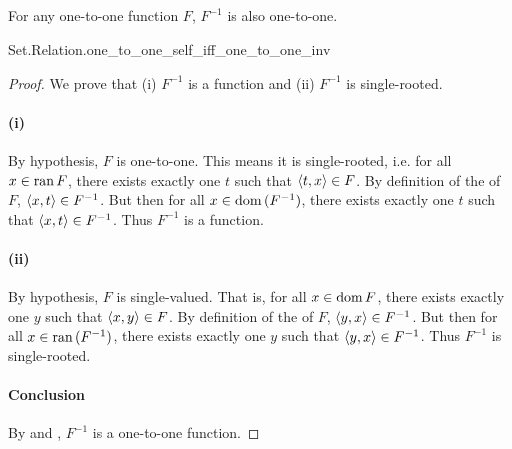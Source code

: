\documentclass{report}
\begin{document}
\subsection{}%

  \begin{lemma}[1]
    For any one-to-one function $F$, $F^{-1}$ is also one-to-one.
  \end{lemma}

    {Set.Relation.one\_to\_one\_self\_iff\_one\_to\_one\_inv}

  \begin{proof}
    We prove that (i) $F^{-1}$ is a function and (ii) $F^{-1}$ is single-rooted.

    \paragraph{(i)}%

      By hypothesis, $F$ is one-to-one.
      This means it is single-rooted, i.e. for all $x \in \mathop{\text{ran}}{F}$, there exists
        exactly one $t$ such that $\left< t, x \right> \in F$.
      By definition of the  of $F$,
        $\left< x, t \right> \in F^{-1}$.
      But then for all $x \in \mathop{\text{dom}}{(F^{-1})}$, there exists exactly one $t$ such
        that $\left< x, t \right> \in F^{-1}$.
      Thus $F^{-1}$ is a function.

    \paragraph{(ii)}%

      By hypothesis, $F$ is single-valued.
      That is, for all $x \in \mathop{\text{dom}}{F}$, there exists exactly one $y$ such that
        $\left< x, y \right> \in F$.
      By definition of the  of $F$,
        $\left< y, x \right> \in F^{-1}$.
      But then for all $x \in \mathop{\text{ran}}{(F^{-1})}$, there exists exactly one $y$ such
        that $\left< y, x \right> \in F^{-1}$.
      Thus $F^{-1}$ is single-rooted.

    \paragraph{Conclusion}%

      By  and , $F^{-1}$ is
        a one-to-one function.

  \end{proof}
\end{document}
